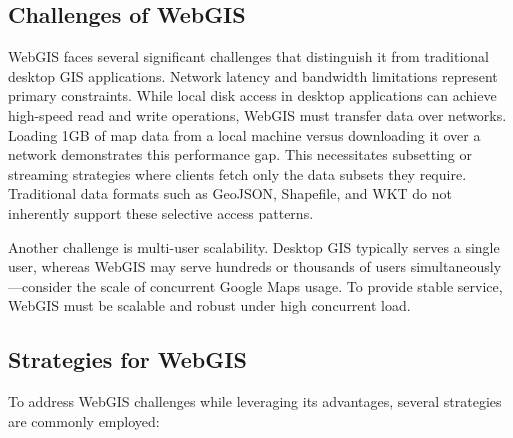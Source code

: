 \subsection{Challenges of WebGIS}
\label{tb:challenges_of_webgis}

WebGIS faces several significant challenges that distinguish it from traditional desktop GIS applications. Network latency and bandwidth limitations represent primary constraints. While local disk access in desktop applications can achieve high-speed read and write operations, WebGIS must transfer data over networks. Loading 1GB of map data from a local machine versus downloading it over a network demonstrates this performance gap. This necessitates subsetting or streaming strategies where clients fetch only the data subsets they require. Traditional data formats such as GeoJSON, Shapefile, and WKT do not inherently support these selective access patterns.

Another challenge is multi-user scalability. Desktop GIS typically serves a single user, whereas WebGIS may serve hundreds or thousands of users simultaneously—consider the scale of concurrent Google Maps usage. To provide stable service, WebGIS must be scalable and robust under high concurrent load.

\subsection{Strategies for WebGIS}
\label{tb:strategies_for_webgis}

To address WebGIS challenges while leveraging its advantages, several strategies are commonly employed:

